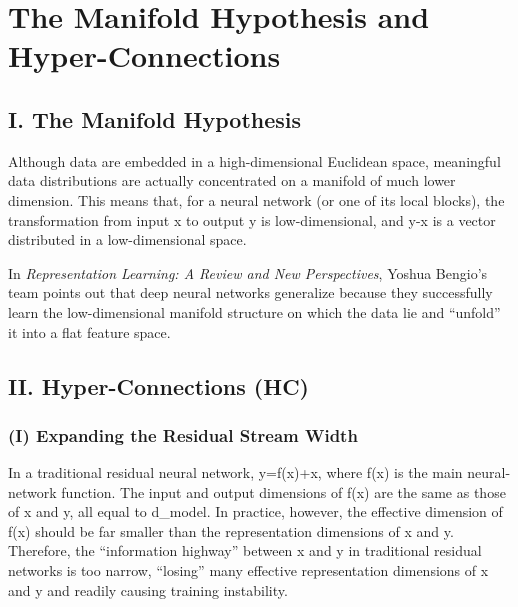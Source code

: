 \setcounter{section}{2}

\hypertarget{the-manifold-hypothesis-and-hyper-connections}{%
\section{The Manifold Hypothesis and Hyper-Connections}\label{the-manifold-hypothesis-and-hyper-connections}}

\hypertarget{i.-the-manifold-hypothesis}{%
\subsection{I. The Manifold Hypothesis}\label{i.-the-manifold-hypothesis}}

Although data are embedded in a high-dimensional Euclidean space, meaningful data distributions are actually concentrated on a manifold of much lower dimension. This means that, for a neural network (or one of its local blocks), the transformation from input x to output y is low-dimensional, and y-x is a vector distributed in a low-dimensional space.

In \emph{Representation Learning: A Review and New Perspectives}, Yoshua Bengio's team points out that deep neural networks generalize because they successfully learn the low-dimensional manifold structure on which the data lie and ``unfold'' it into a flat feature space.

\hypertarget{ii.-hyper-connections-hc}{%
\subsection{II. Hyper-Connections (HC)}\label{ii.-hyper-connections-hc}}

\hypertarget{i-expanding-the-residual-stream-width}{%
\subsubsection{(I) Expanding the Residual Stream Width}\label{i-expanding-the-residual-stream-width}}

In a traditional residual neural network, y=f(x)+x, where f(x) is the main neural-network function. The input and output dimensions of f(x) are the same as those of x and y, all equal to d\_model. In practice, however, the effective dimension of f(x) should be far smaller than the representation dimensions of x and y. Therefore, the ``information highway'' between x and y in traditional residual networks is too narrow, ``losing'' many effective representation dimensions of x and y and readily causing training instability.

